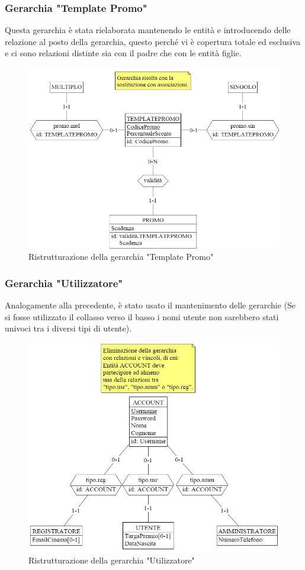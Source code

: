 \documentclass[a4paper,12pt]{report}
\begin{document}
	\subsubsection{Gerarchia "Template Promo"}
	Questa gerarchia è stata rielaborata mantenendo le entità e introducendo delle relazione al posto della gerarchia, questo perché vi è copertura totale ed esclusiva e ci sono relazioni distinte sia con il padre che con le entità figlie.
	\begin{figure}[H]
		\centering
		\includegraphics[width=400pt]{ER/ristrutturazione/ristpromo.png}
		\caption{Ristrutturazione della gerarchia "Template Promo"}
	\end{figure}
	\subsubsection{Gerarchia "Utilizzatore"}
	Analogamente alla precedente, è stato usato il mantenimento delle gerarchie (Se si fosse utilizzato il collasso verso il basso i nomi utente non sarebbero stati univoci tra i diversi tipi di utente).
	\begin{figure}[H]
		\centering
		\includegraphics{ER/ristrutturazione/ristutenza.png}
		\caption{Ristrutturazione della gerarchia "Utilizzatore"}
	\end{figure}
\end{document}
